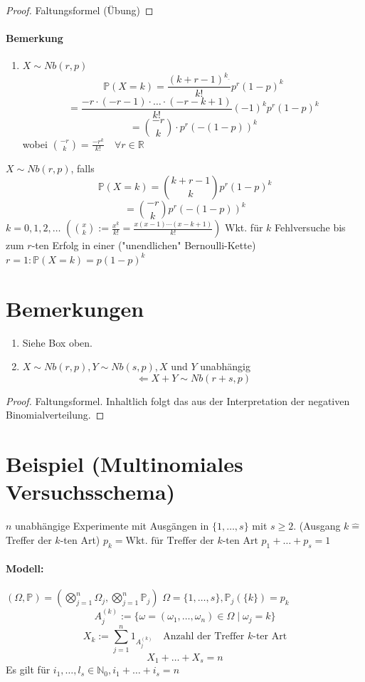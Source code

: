 \documentclass[a4paper,11pt,notitlepage]{report}
\newcommand{\R}{{\ensuremath{\mathbb{R}}}}
\newcommand{\N}{{\ensuremath{\mathbb{N}}}}
\newcommand{\Prim}{{\ensuremath{\mathbb{P}}}}
\begin{document}
\begin{proof}
	Faltungsformel (Übung)
\end{proof}

\paragraph{Bemerkung}
\begin{enumerate}
	\item $X \sim Nb(r,p)$
		$$\Prim(X=k) = \frac{(k+r-1)^{k_\_}}{k!} p^r (1-p)^k$$
		$$= \frac{-r \cdot (-r-1) \cdot \ldots \cdot (-r-k+1)}{k!} (-1)^k p^r (1-p)^k$$
		$$= {-r \choose k} \cdot p^r (-(1-p))^k$$
		wobei ${-r \choose k} = \frac{-r^k}{k!} \quad \forall r \in \R$
\end{enumerate}

$X \sim Nb(r,p)$, falls
$$\Prim(X=k)= {k+r-1 \choose k} p^r (1-p)^k$$
$$= \boxed{{-r \choose k} p^r (-(1-p))^k}$$
$k = 0,1,2,\ldots$
$({x \choose k} := \frac{x^{\underline{k}}}{k!} = \frac{x(x-1)\cdots (x-k+1)}{k!})$
Wkt. für $k$ Fehlversuche bis zum $r$-ten Erfolg in einer ("unendlichen" Bernoulli-Kette) $r = 1: \Prim(X=k) = p (1-p)^k$

\section{Bemerkungen}
\begin{enumerate}
	\item Siehe Box oben.
	\item $X \sim Nb(r,p), Y \sim Nb(s,p), X$ und $Y$ unabhängig $$\Leftarrow X+Y \sim Nb(r+s,p)$$
\end{enumerate}

\begin{proof}
	Faltungsformel.
	Inhaltlich folgt das aus der Interpretation der negativen Binomialverteilung.
\end{proof}

\section{Beispiel (Multinomiales Versuchsschema)}

$n$ unabhängige Experimente mit Ausgängen in $\{1,\ldots,s\}$ mit $s \geq 2$. (Ausgang $k \hat{=}$ Treffer der $k$-ten Art) \newline
$p_k = \text{Wkt. für Treffer der $k$-ten Art}$ \newline
$p_1 + \ldots + p_s = 1$
\paragraph{Modell:} $(\Omega, \Prim) = (\bigotimes\limits_{j=1}^n{\Omega_j}, \bigotimes\limits_{j=1}^n{\Prim_j})$
\newline
$\Omega = \{1,\ldots,s\}, \Prim_j(\{k\}) = p_k$
\newline
$$A_j^{(k)}:= \{\omega = (\omega_1, \ldots, \omega_n) \in \Omega \mid \omega_j = k \}$$
$$X_k:= \sum\limits_{j=1}^n{1_{A_j^{(k)}}} \quad \text{Anzahl der Treffer $k$-ter Art}$$
$$X_1 + \ldots + X_s = n$$
Es gilt für $i_1, \ldots, l_s \in \N_0, i_1 + \ldots + i_s = n$
\end{document}
